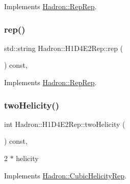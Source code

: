 Implements \mbox{\hyperlink{structHadron_1_1RepRep_ab3213025f6de249f7095892109575fde}{Hadron\+::\+Rep\+Rep}}.

\mbox{\label{structHadron_1_1H1D4E2Rep_a21042b3f507f32a467b776db77aa093f}} 
\subsubsection{\texorpdfstring{rep()}{rep()}\hspace{0.1cm}{\footnotesize\ttfamily [5/5]}}
{\footnotesize\ttfamily std\+::string Hadron\+::\+H1\+D4\+E2\+Rep\+::rep (\begin{DoxyParamCaption}{ }\end{DoxyParamCaption}) const\hspace{0.3cm}{\ttfamily [inline]}, {\ttfamily [virtual]}}



Implements \mbox{\hyperlink{structHadron_1_1RepRep_ab3213025f6de249f7095892109575fde}{Hadron\+::\+Rep\+Rep}}.

\mbox{\label{structHadron_1_1H1D4E2Rep_a47b668915545d363a373bd37f3bfb75f}} 
\subsubsection{\texorpdfstring{twoHelicity()}{twoHelicity()}\hspace{0.1cm}{\footnotesize\ttfamily [1/3]}}
{\footnotesize\ttfamily int Hadron\+::\+H1\+D4\+E2\+Rep\+::two\+Helicity (\begin{DoxyParamCaption}{ }\end{DoxyParamCaption}) const\hspace{0.3cm}{\ttfamily [inline]}, {\ttfamily [virtual]}}

2 $\ast$ helicity 

Implements \mbox{\hyperlink{structHadron_1_1CubicHelicityRep_af507aa56fc2747eacc8cb6c96db31ecc}{Hadron\+::\+Cubic\+Helicity\+Rep}}.

\mbox{\label{structHadron_1_1H1D4E2Rep_a47b668915545d363a373bd37f3bfb75f}} 

